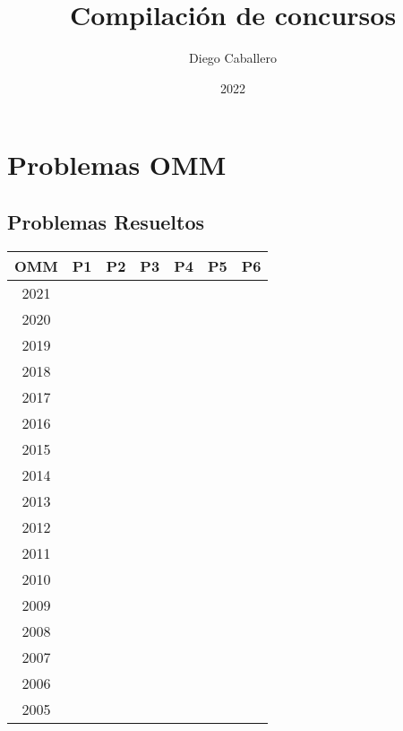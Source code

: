 \documentclass[11pt]{scrartcl}
\begin{document}
\title{Compilación de concursos}
\author{Diego Caballero}
\date{2022}
\maketitle

\hypertarget{tabla}{\tableofcontents}
\vfill
\eject

\section{Problemas OMM}

    \subsection*{Problemas Resueltos}
    \begin{center} 
        \begin{tabular}{| c | c | c | c | c | c | c |}
            \hline
            OMM & P1 & P2 & P3 & P4 & P5 & P6 \\
            \hline
            2021 & & & & & & \\
            \hline
            2020 & & & & & & \\
            \hline
            2019 & & & & & & \\
            \hline
            2018 & & & & & & \\
            \hline
            2017 & & & & & & \\
            \hline
            2016 & & & & & & \\
            \hline
            2015 & & & & & & \\
            \hline
            2014 & & & & & & \\
            \hline
            2013 & & & & & & \\
            \hline
            2012 & & & & & & \\
            \hline
            2011 & & & & & & \\
            \hline
            2010 & & & & & & \\
            \hline
            2009 & & & & & & \\
            \hline
            2008 & & & & & & \\
            \hline
            2007 & & & & & & \\
            \hline
            2006 & & & & & & \\
            \hline
            2005 & & & & & & \\

\end{tabular}
\end{center}
\end{document}
